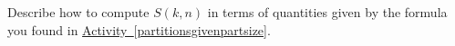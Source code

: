 \documentclass{book}
\begin{document}
\setcounter{cpjt}{277}
\addtocounter{cpjt}{-1}
\begin{activity}\label{activity-270}
\hypertarget{p-1416}{}%
Describe how to compute \(S(k,n)\) in terms of quantities given by the formula you found in \hyperref[partitionsgivenpartsize]{Activity~\ref{partitionsgivenpartsize}}.%
\par\smallskip%
\noindent\end{activity}

\clearpage
\end{document}
